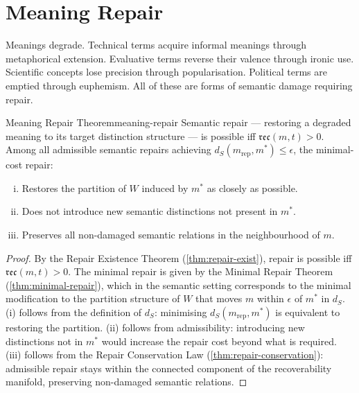 \documentclass[12pt,twoside,openright]{book}
\newcommand{\reco}{\mathfrak{rec}}
\begin{document}
\section{Meaning Repair}

Meanings degrade. Technical terms acquire informal
meanings through metaphorical extension. Evaluative
terms reverse their valence through ironic use.
Scientific concepts lose precision through
popularisation. Political terms are emptied through
euphemism. All of these are forms of semantic damage
requiring repair.

\begin{theorem}{Meaning Repair Theorem}{meaning-repair}
  Semantic repair — restoring a degraded meaning to
  its target distinction structure — is possible iff
  $\reco(m, t) > 0$.
  Among all admissible semantic repairs achieving
  $d_S(m_\mathrm{rep}, m^*) \le \epsilon$,
  the minimal-cost repair:
  \begin{enumerate}[(i)]
    \item Restores the partition of $W$ induced by $m^*$
          as closely as possible.
    \item Does not introduce new semantic distinctions
          not present in $m^*$.
    \item Preserves all non-damaged semantic relations
          in the neighbourhood of $m$.
  \end{enumerate}
\end{theorem}

\begin{proof}
  By the Repair Existence Theorem
  (\cref{thm:repair-exist}), repair is possible iff
  $\reco(m,t) > 0$.
  The minimal repair is given by the Minimal Repair
  Theorem (\cref{thm:minimal-repair}), which in the
  semantic setting corresponds to the minimal
  modification to the partition structure of $W$
  that moves $m$ within $\epsilon$ of $m^*$ in $d_S$.
  (i) follows from the definition of $d_S$: minimising
  $d_S(m_\mathrm{rep}, m^*)$ is equivalent to
  restoring the partition.
  (ii) follows from admissibility: introducing new
  distinctions not in $m^*$ would increase
  the repair cost beyond what is required.
  (iii) follows from the Repair Conservation Law
  (\cref{thm:repair-conservation}): admissible repair
  stays within the connected component of the
  recoverability manifold, preserving non-damaged
  semantic relations.
\end{proof}
\end{document}
